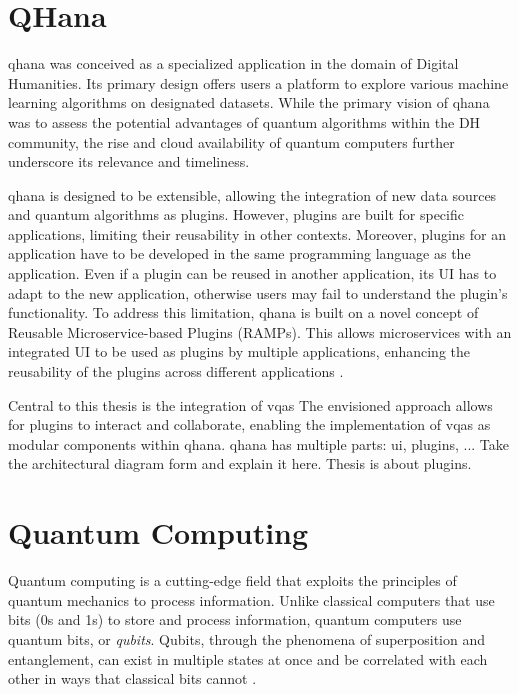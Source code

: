 \documentclass[
  a4paper,  %
  twoside,  %
  bibliography=totoc,
  headsepline,
  cleardoublepage=empty,
  parskip=half,
  draft=false
]{scrbook}
\begin{document}
\section{QHana}
\label{sec:qhana}

\gls{qhana} was conceived as a specialized application in the domain of Digital Humanities.
Its primary design offers users a platform to explore various machine learning algorithms on designated datasets.
While the primary vision of \gls{qhana} was to assess the potential advantages of quantum algorithms within the DH community, the rise and cloud availability of quantum computers further underscore its relevance and timeliness.

\gls{qhana} is designed to be extensible, allowing the integration of new data sources and quantum algorithms as plugins.
However, plugins are built for specific applications, limiting their reusability in other contexts.
Moreover, plugins for an application have to be developed in the same programming language as the application.
Even if a plugin can be reused in another application, its UI has to adapt to the new application, otherwise users may fail to understand the plugin's functionality.
To address this limitation, \gls{qhana} is built on a novel concept of Reusable Microservice-based Plugins (RAMPs).
This allows microservices with an integrated UI to be used as plugins by multiple applications, enhancing the reusability of the plugins across different applications \cite{Buehler2022}.

Central to this thesis is the integration of \glspl{vqa}
The envisioned approach allows for plugins to interact and collaborate, enabling the implementation of \glspl{vqa} as modular components within \gls{qhana}.
\gls{qhana} has multiple parts: \gls{ui}, plugins, ...
Take the architectural diagram form \cite{Buehler2022} and explain it here.
Thesis is about plugins.



\section{Quantum Computing}
\label{sec:quantumComputing}
Quantum computing is a cutting-edge field that exploits the principles of quantum mechanics to process information.
Unlike classical computers that use bits (0s and 1s) to store and process information, quantum computers use quantum bits, or \emph{qubits}.
Qubits, through the phenomena of superposition and entanglement, can exist in multiple states at once and be correlated with each other in ways that classical bits cannot \cite{Nielsen2010}.
\end{document}
